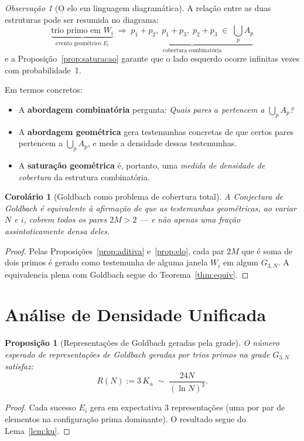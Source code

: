 \documentclass[12pt,a4paper]{article}
\newtheorem{proposition}[theorem]{Proposi\c{c}\~ao}
\newtheorem{corollary}[theorem]{Corol\'ario}
\theoremstyle{remark}
\newtheorem{remark}[theorem]{Observa\c{c}\~ao}
\begin{document}
	\begin{remark}[O elo em linguagem diagramática]
		A rela\c{c}\~ao entre as duas estruturas pode ser resumida no diagrama:
		\[
		\underbrace{\text{trio primo em }W_i}_{\text{evento geom\'etrico }E_i}
		\;\Longrightarrow\;
		\underbrace{p_1{+}p_2,\;p_1{+}p_3,\;p_2{+}p_3\;\in\;\bigcup_p A_p}_{\text{cobertura combinat\'oria}}
		\]
		e a Proposi\c{c}\~ao~\ref{prop:saturacao} garante que o lado esquerdo ocorre
		infinitas vezes com probabilidade~1.
		
		Em termos concretos:
		\begin{itemize}
			\item A \textbf{abordagem combinat\'oria} pergunta:
			\emph{Quais pares $a$ pertencem a $\bigcup_p A_p$?}
			\item A \textbf{abordagem geom\'etrica} gera testemunhas concretas
			de que certos pares pertencem a $\bigcup_p A_p$,
			e mede a densidade dessas testemunhas.
			\item A \textbf{satura\c{c}\~ao geom\'etrica} \'e, portanto, uma
			\emph{medida de densidade de cobertura} da estrutura combinat\'oria.
		\end{itemize}
	\end{remark}
	
	\begin{corollary}[Goldbach como problema de cobertura total]
		\label{cor:cobertura}
		A Conjectura de Goldbach \'e equivalente \`a afirma\c{c}\~ao de que as testemunhas
		geom\'etricas, ao variar $N$ e $i$, cobrem \emph{todos} os pares $2M>2$
		--- e n\~ao apenas uma fra\c{c}\~ao assintoticamente densa deles.
	\end{corollary}
	\begin{proof}
		Pelas Proposi\c{c}\~oes~\ref{prop:aditiva} e~\ref{prop:elo}, cada par $2M$ que
		\'e soma de dois primos \'e gerado como testemunha de alguma janela $W_i$
		em algum $G_{3,N}$.  A equivalencia plena com Goldbach segue do
		Teorema~\ref{thm:equiv}.
	\end{proof}
	
	\section{An\'alise de Densidade Unificada}
	
	\begin{proposition}[Representações de Goldbach geradas pela grade]
		O n\'umero esperado de representa\c{c}\~oes de Goldbach geradas por trios primos
		na grade $G_{3,N}$ satisfaz:
		\[
		R(N) := 3\,K_u \;\sim\; \frac{24N}{(\ln N)^3}.
		\]
	\end{proposition}
	\begin{proof}
		Cada sucesso $E_i$ gera em expectativa 3 representa\c{c}\~oes (uma por par
		de elementos na configura\c{c}\~ao prima dominante).
		O resultado segue do Lema~\ref{lem:ku}.
	\end{proof}
	
\end{document}

